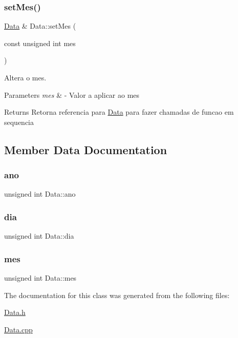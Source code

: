 \subsubsection{\texorpdfstring{set\+Mes()}{setMes()}}
{\footnotesize\ttfamily \mbox{\hyperlink{class_data}{Data}} \& Data\+::set\+Mes (\begin{DoxyParamCaption}\item[{const unsigned int}]{mes }\end{DoxyParamCaption})}



Altera o mes. 


\begin{DoxyParams}{Parameters}
{\em mes} & -\/ Valor a aplicar ao mes \\
\hline
\end{DoxyParams}
\begin{DoxyReturn}{Returns}
Retorna referencia para \mbox{\hyperlink{class_data}{Data}} para fazer chamadas de funcao em sequencia 
\end{DoxyReturn}


\subsection{Member Data Documentation}
\mbox{\label{class_data_a1811fab972bdf6ed644c4eb7412bd043}} 
\subsubsection{\texorpdfstring{ano}{ano}}
{\footnotesize\ttfamily unsigned int Data\+::ano\hspace{0.3cm}{\ttfamily [private]}}

\mbox{\label{class_data_a71a904380d17858da0b902e9a2563546}} 
\subsubsection{\texorpdfstring{dia}{dia}}
{\footnotesize\ttfamily unsigned int Data\+::dia\hspace{0.3cm}{\ttfamily [private]}}

\mbox{\label{class_data_a586deb479ec2031a0d3ceec8280f7706}} 
\subsubsection{\texorpdfstring{mes}{mes}}
{\footnotesize\ttfamily unsigned int Data\+::mes\hspace{0.3cm}{\ttfamily [private]}}



The documentation for this class was generated from the following files\+:\begin{DoxyCompactItemize}
\item 
\mbox{\hyperlink{_data_8h}{Data.\+h}}\item 
\mbox{\hyperlink{_data_8cpp}{Data.\+cpp}}\end{DoxyCompactItemize}
